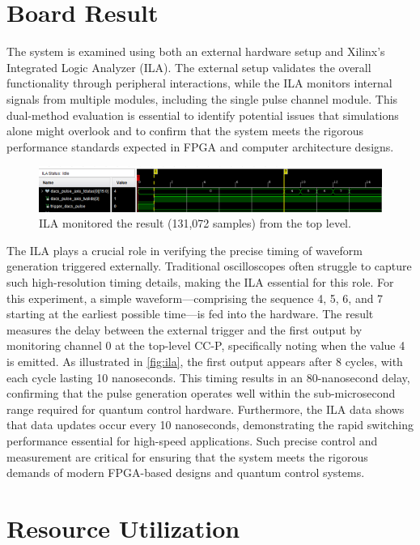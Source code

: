 \section{Board Result}
The system is examined using both an external hardware setup and Xilinx's Integrated Logic Analyzer (ILA). The external setup validates the overall functionality through peripheral interactions, while the ILA monitors internal signals from multiple modules, including the single pulse channel module.  This dual-method evaluation is essential to identify potential issues that simulations alone might overlook and to confirm that the system meets the rigorous performance standards expected in FPGA and computer architecture designs.
\begin{figure}[h]
    \centering
    \includegraphics[width=1\linewidth]{figures/ila.png}
    \caption{ILA monitored the result (131,072 samples) from the top level.}
    \label{fig:ila}
\end{figure}
The ILA plays a crucial role in verifying the precise timing of waveform generation triggered externally. Traditional oscilloscopes often struggle to capture such high-resolution timing details, making the ILA essential for this role. For this experiment, a simple waveform—comprising the sequence 4, 5, 6, and 7 starting at the earliest possible time—is fed into the hardware. The result measures the delay between the external trigger and the first output by monitoring channel 0 at the top-level CC-P, specifically noting when the value 4 is emitted. As illustrated in \autoref{fig:ila}, the first output appears after 8 cycles, with each cycle lasting 10 nanoseconds. This timing results in an 80-nanosecond delay, confirming that the pulse generation operates well within the sub-microsecond range required for quantum control hardware. Furthermore, the ILA data shows that data updates occur every 10 nanoseconds, demonstrating the rapid switching performance essential for high-speed applications. Such precise control and measurement are critical for ensuring that the system meets the rigorous demands of modern FPGA-based designs and quantum control systems.

\section{Resource Utilization}

